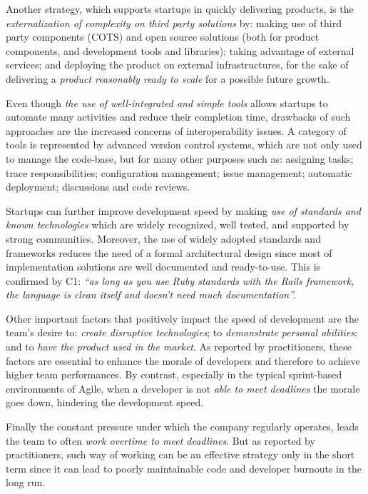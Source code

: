 \documentclass[10pt,journal,letterpaper,compsoc]{IEEEtran}
\begin{document}
Another strategy, which supports startups in quickly delivering products, is the \textit{externalization of complexity on third party solutions} by: making use of third party components (COTS) and open source solutions (both for product components, and development tools and libraries); taking advantage of  external services; and deploying the product on external infrastructures, for the sake of delivering a \textit{product reasonably ready to scale} for a possible future growth.

Even though \textit{the use of well-integrated and simple tools} allows startups to automate many activities and reduce their completion time, drawbacks of such approaches are the increased concerns of interoperability issues. A category of tools is represented by advanced version control systems, which are not only used to manage the code-base, but for many other purposes such as: assigning tasks; trace responsibilities; configuration management; issue management; automatic deployment; discussions and code reviews.

Startups can further improve development speed by making \textit{use of standards and known technologies} which are widely recognized, well tested, and supported by strong communities. Moreover, the use of widely adopted standards and frameworks reduces the need of a formal architectural design since most of implementation solutions are well documented and ready-to-use. This is confirmed by C1: \textit{``as long as you use Ruby standards with the Rails framework, the language is clean itself and doesn't need much documentation''.}

Other important factors that positively impact the speed of development are the team's desire to: \textit{create disruptive technologies}; to \textit{demonstrate personal abilities}; and to \textit{have the product used in the market}. As reported by practitioners, these factors are essential to enhance the morale of developers and therefore to achieve higher team performances. By contrast, especially in the typical sprint-based environments of Agile, when a developer is not \textit{able to meet deadlines} the morale goes down, hindering the development speed.

Finally the constant pressure under which the company regularly operates, leads the team to often \textit{work overtime to meet deadlines}. But as reported by practitioners, such way of working can be an effective strategy only in the short term since it can lead to poorly maintainable code and developer burnouts in the long run.
\end{document}
